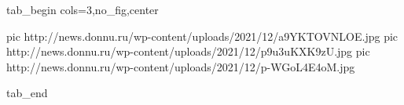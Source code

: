  
 
 
 
 


\ifcmt
  tab_begin cols=3,no_fig,center

     pic http://news.donnu.ru/wp-content/uploads/2021/12/a9YKTOVNLOE.jpg
		 pic http://news.donnu.ru/wp-content/uploads/2021/12/p9u3uKXK9zU.jpg
		 pic http://news.donnu.ru/wp-content/uploads/2021/12/p-WGoL4E4oM.jpg

  tab_end
\fi
